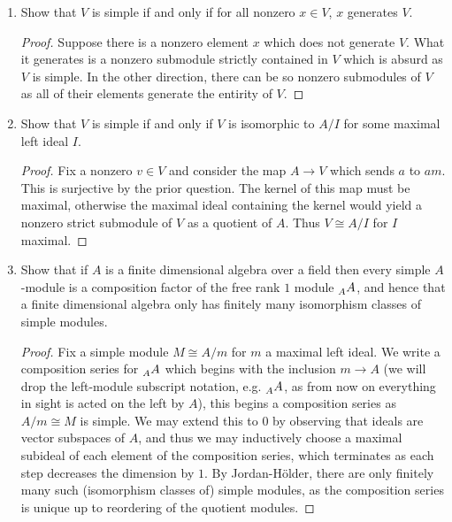 \documentclass[reqno]{amsart}
\theoremstyle{definition}
\theoremstyle{remark}
\begin{document}
\begin{enumerate}
  \item Show that $V$ is simple if and only if for all nonzero $x \in V$, $x$
    generates $V$.

    \begin{proof}
      Suppose there is a nonzero element $x$ which does not generate $V$. What
      it generates is a nonzero submodule strictly contained in $V$ which is
      absurd as $V$ is simple. In the other direction, there can be so nonzero
      submodules of $V$ as all of their elements generate the entirity of $V$.
    \end{proof}

  \item Show that $V$ is simple if and only if $V$ is isomorphic to $A/I$ for
    some maximal left ideal $I$.

    \begin{proof}
      Fix a nonzero $v \in V$ and consider the map $A \to V$ which sends $a$ to
      $am$. This is surjective by the prior question. The kernel of this map
      must be maximal, otherwise the maximal ideal containing the kernel would
      yield a nonzero strict submodule of $V$ as a quotient of $A$. Thus $V
      \cong A/I$ for $I$ maximal.
    \end{proof}

  \item Show that if $A$ is a finite dimensional algebra over a field then every
    simple $A$-module is a composition factor of the free rank $1$ module
    $\prescript{}{A}{A}$, and hence that a finite dimensional algebra only has
    finitely many isomorphism classes of simple modules.

    \begin{proof}
      Fix a simple module $M \cong A/m$ for $m$ a maximal left ideal. We write a
      composition series for $\prescript{}{A}{A}$ which begins with the
      inclusion $m \to A$ (we will drop the left-module subscript notation, e.g.
      $\prescript{}{A}{A}$, as from now on everything in sight is acted on the
      left by $A$), this begins a composition series as $A/m \cong M$ is simple.
      We may extend this to $0$ by observing that ideals are vector subspaces of
      $A$, and thus we may inductively choose a maximal subideal of each element
      of the composition series, which terminates as each step decreases the
      dimension by $1$. By Jordan-Hölder, there are only finitely many such
      (isomorphism classes of) simple modules, as the composition series is
      unique up to reordering of the quotient modules.
    \end{proof}
\end{enumerate}
\end{document}
